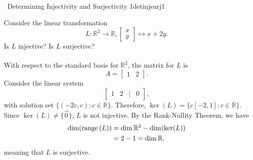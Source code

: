         \begin{example}{\Difficulty\,\Difficulty\,\,Determining Injectivity and Surjectivity 1}{detinjsurj1}

            Consider the linear transformation
            \begin{equation*}
                L:\mathbb{R}^2\to\mathbb{R},\begin{bmatrix} x \\ y \end{bmatrix}\mapsto x+2y.
            \end{equation*}
            Is \(L\) injective? Is \(L\) surjective?
            \\
            \\
            With respect to the standard basis for \(\mathbb{R}^2\), the matrix for \(L\) is
            \begin{equation*}
                A=\begin{bmatrix}
                    1 & 2
                \end{bmatrix}.
            \end{equation*}
            Consider the linear system
            \begin{equation*}
                \begin{bmatrix}
                    1 & 2 & | & 0
                \end{bmatrix},
            \end{equation*}
            with solution set \(\{(-2c,c):c\in\mathbb{R}\}\). Therefore, \(\ker(L)=\{c[-2,1]:c\in\mathbb{R}\}\). Since \(\ker(L)\neq\{\vec{0}\}\), \(L\) is not injective. By the Rank-Nullity Theorem, we have
            \begin{align*}
                \dim(\text{range\,}(L))&=\dim\mathbb{R}^2-\dim(\ker(L)) \\
                &=2-1=\dim\mathbb{R},
            \end{align*}
            meaning that \(L\) is surjective.
            
        \end{example}
